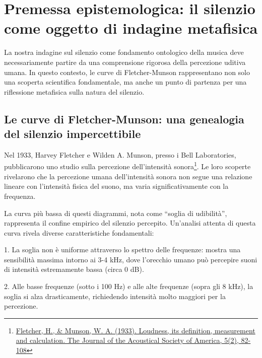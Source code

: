 \documentclass[a4paper,11pt]{article}
\begin{document}
\section{Premessa epistemologica: il silenzio come oggetto di indagine metafisica}\hypertarget{premessa-epistemologica-il-silenzio-come-oggetto-di-indagine-metafisica}{}\label{premessa-epistemologica-il-silenzio-come-oggetto-di-indagine-metafisica}

La nostra indagine sul silenzio come fondamento ontologico della musica
deve necessariamente partire da una comprensione rigorosa della
percezione uditiva umana. In questo contesto, le curve di
Fletcher-Munson rappresentano non solo una scoperta scientifica
fondamentale, ma anche un punto di partenza per una riflessione
metafisica sulla natura del silenzio.



\subsection{Le curve di Fletcher-Munson: una genealogia del silenzio impercettibile}\hypertarget{le-curve-di-fletcher-munson-una-genealogia-del-silenzio-impercettibile}{}\label{le-curve-di-fletcher-munson-una-genealogia-del-silenzio-impercettibile}

Nel 1933, Harvey Fletcher e Wilden A. Munson, presso i Bell
Laboratories, pubblicarono uno studio sulla percezione dell'intensità
sonora\footnote{\href{https://doi.org/10.1121/1.1915893}{Fletcher, H., \& Munson, W. A. (1933). Loudness, its definition,
measurement and calculation. The Journal of the Acoustical Society
of America, 5(2), 82-108}}. Le loro scoperte rivelarono che la percezione umana
dell'intensità sonora non segue una relazione lineare con l'intensità
fisica del suono, ma varia significativamente con la frequenza.

La curva più bassa di questi diagrammi, nota come ``soglia di udibilità'',
rappresenta il confine empirico del silenzio percepito. Un'analisi
attenta di questa curva rivela diverse caratteristiche fondamentali:

1. La soglia non è uniforme attraverso lo spettro delle frequenze:
mostra una sensibilità massima intorno ai 3-4 kHz, dove l'orecchio umano
può percepire suoni di intensità estremamente bassa (circa 0 dB).

2. Alle basse frequenze (sotto i 100 Hz) e alle alte frequenze (sopra
gli 8 kHz), la soglia si alza drasticamente, richiedendo intensità molto
maggiori per la percezione.
\end{document}
